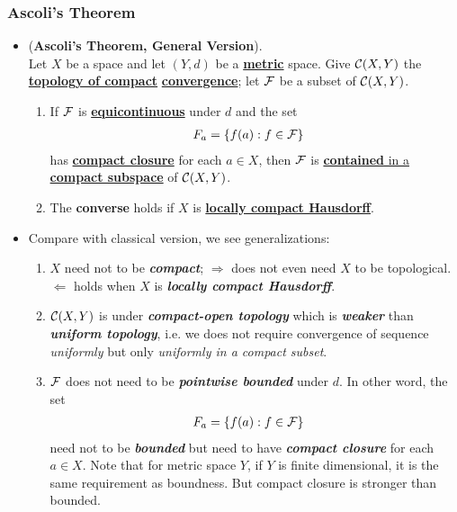 \documentclass[11pt]{article}
\begin{document}
\subsubsection{Ascoli's Theorem}
\begin{itemize}
\item \begin{theorem} (\textbf{Ascoli's Theorem, General Version}). \citep{munkres2000topology} \\
Let $X$ be a space and let $(Y, d)$ be a \underline{\textbf{metric}} space. Give ${\mathcal C}(X, Y)$ the \underline{\textbf{topology of compact}} \underline{\textbf{convergence}}; let ${\mathcal F}$ be a subset of ${\mathcal C}(X, Y)$.
\begin{enumerate}
\item If ${\mathcal F}$ is \underline{\textbf{equicontinuous}} under $d$ and the set
\begin{align*}
F_{a} &= \left\{f(a): f \in {\mathcal F}\right\}
\end{align*}
has \underline{\textbf{compact closure}} for each $a \in X$, then ${\mathcal F}$ is \underline{\textbf{contained} in a \textbf{compact subspace}} of ${\mathcal C}(X, Y)$.
\item  The \textbf{converse} holds if $X$ is \underline{\textbf{locally compact Hausdorff}}.
\end{enumerate}
\end{theorem}

\item \begin{remark} 
Compare with classical version, we see generalizations:
\begin{enumerate}
\item $X$ need not to be \emph{\textbf{compact}}; $\Rightarrow$ does not even need $X$ to be topological. $\Leftarrow$ holds when $X$ is \textbf{\emph{locally compact Hausdorff}}.
\item ${\mathcal C}(X, Y)$ is under \emph{\textbf{compact-open topology}} which is \emph{\textbf{weaker}} than \emph{\textbf{uniform topology}}, i.e. we does not require convergence of sequence \emph{uniformly} but only \emph{uniformly in a compact subset}.
\item ${\mathcal F}$ does not need to be \emph{\textbf{pointwise bounded}} under $d$. In other word, the set 
\begin{align*}
F_{a} &= \left\{f(a): f \in {\mathcal F}\right\}
\end{align*} need not to be \emph{\textbf{bounded}} but need to have \emph{\textbf{compact closure}} for each $a \in X$. Note that for metric space $Y$, if $Y$ is finite dimensional, it is the same requirement as boundness. But compact closure is stronger than bounded.
\end{enumerate}
\end{remark}


\end{itemize}
\end{document}

